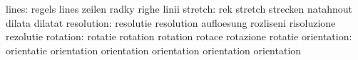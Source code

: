                     lines: regels                    lines
                           zeilen                    radky
                           righe                     linii
                  stretch: rek                       stretch
                           strecken                  natahnout
                           dilata                    dilatat %
               resolution: resolutie                 resolution
                           aufloesung                rozliseni
                           risoluzione               rezolutie
                 rotation: rotatie                   rotation
                           rotation                  rotace
                           rotazione                 rotatie
              orientation: orientatie                orientation
                           orientation               orientation
                           orientation               orientation


